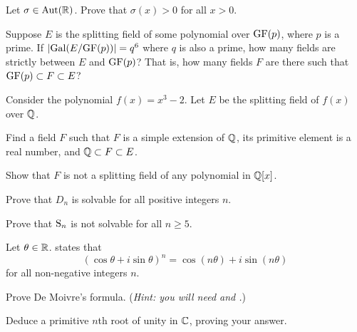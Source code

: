 \begin{problem}
    Let $\sigma \in \mathrm{Aut}(\mathbb{R})$. Prove that $\sigma(x) > 0$ for all $x > 0$.
\end{problem}

\begin{problem}
    Suppose $E$ is the splitting field of some polynomial over $\mathrm{GF}(p)$, where $p$ is a prime. If $|\mathrm{Gal}(E/\mathrm{GF}(p))| = q^6$ where $q$ is also a prime, how many fields are strictly between $E$ and $\mathrm{GF}(p)$? That is, how many fields $F$ are there such that $\mathrm{GF}(p) \subset F \subset E$?
\end{problem}

\begin{problem}
    Consider the polynomial $f(x) = x^3 - 2$. Let $E$ be the splitting field of $f(x)$ over $\mathbb{Q}$.
    \begin{partquestions}{\roman*}
        \item Find a field $F$ such that $F$ is a simple extension of $\mathbb{Q}$, its primitive element is a real number, and $\mathbb{Q} \subset F \subset E$.
        \item Show that $F$ is not a splitting field of any polynomial in $\mathbb{Q}[x]$.
    \end{partquestions}
\end{problem}

\begin{problem}
    Prove that $D_n$ is solvable for all positive integers $n$.
\end{problem}

\begin{problem}
    Prove that $\mathrm{S}_{n}$ is not solvable for all $n \geq 5$.
\end{problem}

\begin{problem}
    Let $\theta \in \mathbb{R}$.  states that
    \[
        (\cos\theta + i\sin\theta)^n = \cos(n\theta) + i\sin(n\theta)
    \]
    for all non-negative integers $n$.
    \begin{partquestions}{\roman*}
        \item Prove De Moivre's formula.\newline
        (\textit{Hint: you will need  and .})
        \item Deduce a primitive $n$th root of unity in $\mathbb{C}$, proving your answer.
    \end{partquestions}
\end{problem}

